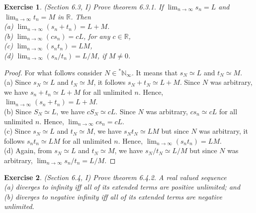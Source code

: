 \documentclass[a4paper, 11pt, openany]{book}
\theoremstyle{plain}
\newtheorem{exercise}{Exercise}[chapter]
\theoremstyle{plain}
\newcommand{\arr}{\rightarrow}
\newcommand{\N}{\mathbb{N}}
\newcommand{\R}{\mathbb{R}}
\newcommand{\hyp}{{}^*}
\begin{document}
  \begin{exercise}
    (Section 6.3, I)
    Prove theorem 6.3.1. If $\lim_{n \arr \infty }s_n=L$ and $\lim_{n \arr \infty} t_n=M$ in $\R$. Then \\
    (a) $\lim_{n\arr \infty} (s_n+t_n)=L+M$. \\
    (b) $\lim_{n \arr \infty} (cs_n)=cL$, for any $c \in \R$, \\
    (c) $\lim_{n \arr \infty} (s_n t_n)=LM$, \\
    (d) $\lim_{n \arr \infty} (s_n/t_n)=L/M$, if $M \not = 0$.
  \end{exercise}
  \begin{proof} For what follows consider $N \in \hyp \N_{\infty}$. It means that $s_N \simeq L$ and $t_N \simeq M$.\\
    (a) Since $s_N \simeq L$ and $t_N \simeq M$, it follows $s_N+t_N \simeq L+M$. Since $N$ was arbitrary, we have $s_n+t_n \simeq L+M$ for all unlimited $n$. Hence, $\lim_{n \arr \infty } (s_n+t_n)=L+M$. \\
    (b) Since $S_N \simeq L$, we have $c S_N \simeq cL$. Since $N$ was arbitrary, $cs_n \simeq cL$ for all unlimited $n$. Hence, $\lim_{n \arr \infty } cs_n=cL$. \\
    (c) Since $s_N \simeq L$ and $t_N \simeq M$, we have $s_N t_N \simeq LM$ but since $N$ was arbitrary, it follows $s_nt_n \simeq LM$ for all unlimited $n$. Hence, $\lim_{n \arr \infty} (s_n t_n)=LM$. \\
    (d) Again, from $s_N \simeq L$ and $t_N \simeq M$, we have $s_N/t_N \simeq L/M$ but since $N$ was arbitrary, $\lim_{n \arr \infty } s_n/t_n=L/M$.
  \end{proof}
  \begin{exercise}
    (Section 6.4, I)
    Prove theorem 6.4.2. A real valued sequence \\
    (a) diverges to infinity iff all of its extended terms are positive unlimited; and \\
    (b) diverges to negative infinity iff all of its extended terms are negative unlimited.
  \end{exercise}
\end{document}
